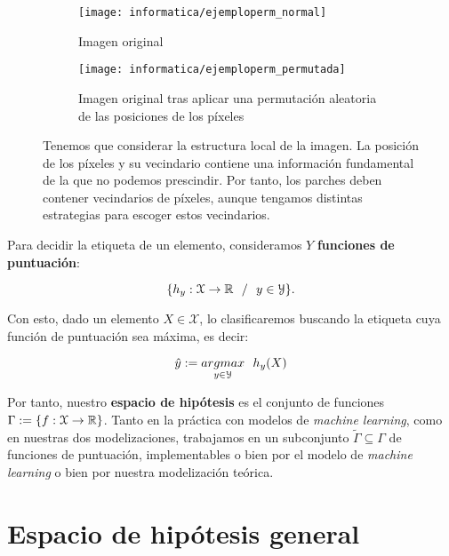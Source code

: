 \begin{figure}[!hbtp]
	\centering
	\ajustarsubcaptions
	\begin{subfigure}[t]{0.45\textwidth}
		\centering
		\texttt{[image: informatica/ejemploperm\_normal]}
		\caption{Imagen original}
	\end{subfigure}
	\begin{subfigure}[t]{0.45\textwidth}
		\centering
		\texttt{[image: informatica/ejemploperm\_permutada]}
		\caption{Imagen original tras aplicar una permutación aleatoria de las posiciones de los píxeles}
	\end{subfigure}
	\caption{Tenemos que considerar la estructura local de la imagen. La posición de los píxeles y su vecindario contiene una información fundamental de la que no podemos prescindir. Por tanto, los parches deben contener vecindarios de píxeles, aunque tengamos distintas estrategias para escoger estos vecindarios.}
	\label{img:desordenar_pixeles_repetida_mates}
\end{figure}

Para decidir la etiqueta de un elemento, consideramos $Y$ \textbf{funciones de puntuación}:

\begin{equation}
	\{ h_y: \mathcal{X} \to \mathbb{R} \ \  / \ \  y \in \mathcal{Y} \}.
\end{equation}

Con esto, dado un elemento $X \in \mathcal{X}$, lo clasificaremos buscando la etiqueta cuya función de puntuación sea máxima, es decir:

$$\hat{y} := \underset{y \in \mathcal{Y}}{argmax} \ \  h_y(X)$$

Por tanto, nuestro \textbf{espacio de hipótesis} es el conjunto de funciones $\Gamma := \{ f: \mathcal{X} \to \mathbb{R} \}$. Tanto en la práctica con modelos de \textit{machine learning}, como en nuestras dos modelizaciones, trabajamos en un subconjunto $\tilde{\Gamma} \subseteq \Gamma$ de funciones de puntuación, implementables o bien por el modelo de \textit{machine learning} o bien por nuestra modelización teórica.

\section{Espacio de hipótesis general}

